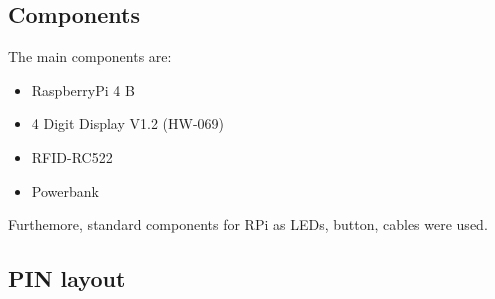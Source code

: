 \documentclass{article}
\begin{document}
\subsection{Components}
The main components are:
\begin{itemize}
    \item RaspberryPi 4 B
    \item 4 Digit Display V1.2 (HW-069) 
    \item RFID-RC522
    \item Powerbank
\end{itemize}
Furthemore, standard components for RPi as LEDs, button, cables were used.

\subsection{PIN layout}
\end{document}
